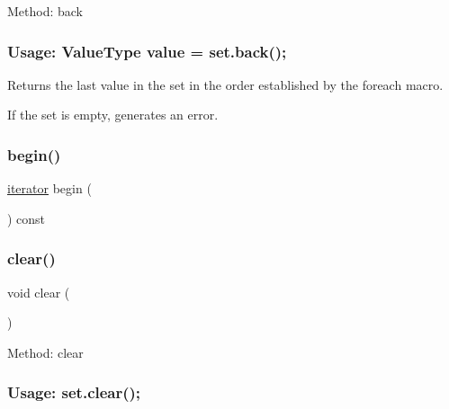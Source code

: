 Method\+: back \subsubsection*{Usage\+: Value\+Type value = set.\+back(); }

Returns the last value in the set in the order established by the {\ttfamily foreach} macro. 

If the set is empty, generates an error. \mbox{\label{classstanfordcpplib_1_1collections_1_1GenericSet_a0c62c15c8ed609e7e5e9518cf5f5c712}} 
\subsubsection{\texorpdfstring{begin()}{begin()}}
{\footnotesize\ttfamily \mbox{\hyperlink{classstanfordcpplib_1_1collections_1_1GenericSet_ab3d10e70baaeac78e76b7abae7e2cf76}{iterator}} begin (\begin{DoxyParamCaption}{ }\end{DoxyParamCaption}) const\hspace{0.3cm}{\ttfamily [inline]}}

\mbox{\label{classstanfordcpplib_1_1collections_1_1GenericSet_ac8bb3912a3ce86b15842e79d0b421204}} 
\subsubsection{\texorpdfstring{clear()}{clear()}}
{\footnotesize\ttfamily void clear (\begin{DoxyParamCaption}{ }\end{DoxyParamCaption})}



Method\+: clear \subsubsection*{Usage\+: set.\+clear(); }


